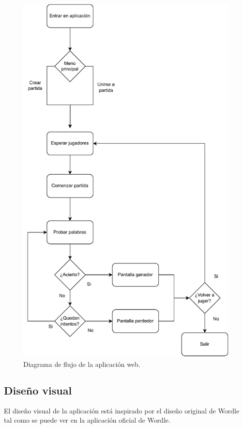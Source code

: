 \begin{figure}[H]
	\centering
	\includegraphics[clip=true,width=\textwidth]{./diagrams/webapp_flow.pdf}
	\caption{Diagrama de flujo de la aplicación web.}
	\label{fig:web_diagram}
\end{figure}

\subsection{Diseño visual}
El diseño visual de la aplicación está inspirado por el diseño original de Wordle tal como se puede ver en la aplicación oficial de Wordle.

